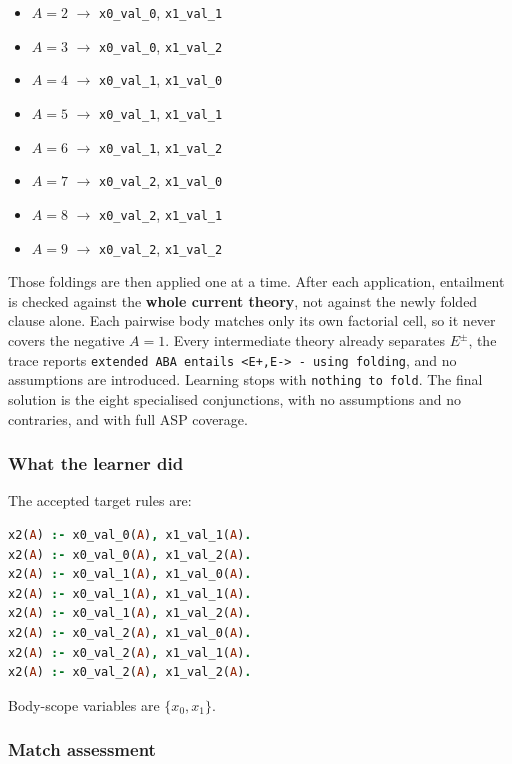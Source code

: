 \documentclass[11pt]{article}
\begin{document}
\begin{itemize}
  \item \(A=2\) \(\rightarrow\) \texttt{x0\_val\_0}, \texttt{x1\_val\_1}
  \item \(A=3\) \(\rightarrow\) \texttt{x0\_val\_0}, \texttt{x1\_val\_2}
  \item \(A=4\) \(\rightarrow\) \texttt{x0\_val\_1}, \texttt{x1\_val\_0}
  \item \(A=5\) \(\rightarrow\) \texttt{x0\_val\_1}, \texttt{x1\_val\_1}
  \item \(A=6\) \(\rightarrow\) \texttt{x0\_val\_1}, \texttt{x1\_val\_2}
  \item \(A=7\) \(\rightarrow\) \texttt{x0\_val\_2}, \texttt{x1\_val\_0}
  \item \(A=8\) \(\rightarrow\) \texttt{x0\_val\_2}, \texttt{x1\_val\_1}
  \item \(A=9\) \(\rightarrow\) \texttt{x0\_val\_2}, \texttt{x1\_val\_2}
\end{itemize}

Those foldings are then applied one at a time. After each application, entailment is checked against the \textbf{whole current theory}, not against the newly folded clause alone. Each pairwise body matches only its own factorial cell, so it never covers the negative \(A=1\). Every intermediate theory already separates \(E^\pm\), the trace reports \texttt{extended ABA entails <E+,E-> - using folding}, and no assumptions are introduced. Learning stops with \texttt{nothing to fold}. The final solution is the eight specialised conjunctions, with no assumptions and no contraries, and with full ASP coverage.

\subsubsection{What the learner did}

The accepted target rules are:

\begin{lstlisting}[style=logic,language=Prolog]
x2(A) :- x0_val_0(A), x1_val_1(A).
x2(A) :- x0_val_0(A), x1_val_2(A).
x2(A) :- x0_val_1(A), x1_val_0(A).
x2(A) :- x0_val_1(A), x1_val_1(A).
x2(A) :- x0_val_1(A), x1_val_2(A).
x2(A) :- x0_val_2(A), x1_val_0(A).
x2(A) :- x0_val_2(A), x1_val_1(A).
x2(A) :- x0_val_2(A), x1_val_2(A).
\end{lstlisting}

Body-scope variables are \(\{x_0,x_1\}\).

\subsubsection{Match assessment}
\end{document}
